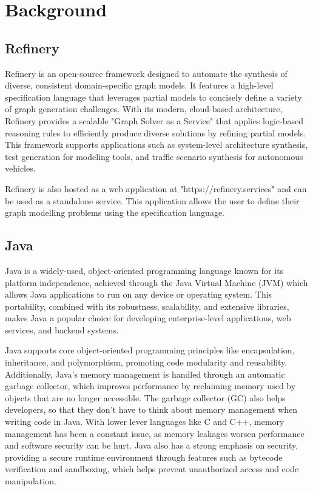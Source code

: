 \chapter{Background} \label{Background}
\section{Refinery}
	Refinery \cite{refinery} is an open-source framework designed to automate the synthesis of diverse, consistent domain-specific graph models. 
	It features a high-level specification language that leverages partial models to concisely define a variety of graph generation challenges. 
	With its modern, cloud-based architecture, Refinery provides a scalable "Graph Solver as a Service" that applies logic-based reasoning rules to 
	efficiently produce diverse solutions by refining partial models. This framework supports applications such as system-level architecture synthesis,
	test generation for modeling tools, and traffic scenario synthesis for autonomous vehicles.

	Refinery is also hosted as a web application at "https://refinery.services" and can be used as a standalone service.
	This application allows the user to define their graph modelling problems using the specification language. 

\section{Java}
	Java \cite{java} is a widely-used, object-oriented programming language known for its platform independence, achieved through the Java Virtual Machine (JVM) 
	which allows Java applications to run on any device or operating system. This portability, combined with its robustness, scalability, and extensive libraries,
	makes Java a popular choice for developing enterprise-level applications, web services, and backend systems.

	Java supports core object-oriented programming principles like encapsulation, inheritance, and polymorphism, promoting code modularity and reusability.
	Additionally, Java’s memory management is handled through an automatic garbage collector, which improves performance by reclaiming memory used by objects 
	that are no longer accessible. The garbage collector (GC) also helps developers, so that they don't have to think about memory management when writing code in Java.
	With lower lever languages like C and C++, memory management has been a constant issue, as memory leakages worsen performance and software security can be hurt.
	Java also has a strong emphasis on security, providing a secure runtime environment through features such as bytecode 
	verification and sandboxing, which helps prevent unauthorized access and code manipulation.

